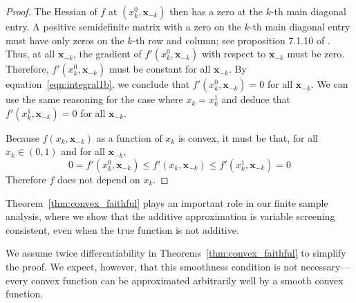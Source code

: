\begin{proof}
The Hessian of $f$ at $(x^0_k, \mathbf{x}_{-k})$ then has a zero at
the $k$-th main diagonal entry. A positive semidefinite matrix with a
zero on the $k$-th main diagonal entry must have only zeros on the
$k$-th row and column; see proposition 7.1.10 of
\citet{HJ90}.  Thus, at all $\mathbf{x}_{-k}$, the
gradient of $f'(x^0_k, \mathbf{x}_{-k})$ with respect to
$\mathbf{x}_{-k}$ must be zero.
Therefore, $f'(x_k^0, \mathbf{x}_{-k})$ must be constant for all
$\mathbf{x}_{-k}$. By equation~\ref{eqn:integral1b}, we conclude 
that $f'(x_k^0, \mathbf{x}_{-k}) = 0$ for all $\mathbf{x}_{-k}$. We
can use the same reasoning for the case where $x_k = x_k^1$ and deduce
that $f'(x^1_k, \mathbf{x}_{-k}) = 0$ for all $\mathbf{x}_{-k}$. 

Because $f(x_k, \mathbf{x}_{-k})$ as a function of $x_k$ is convex, it must be that, for all $x_k \in (0,1)$ and for all $\mathbf{x}_{-k}$,
\begin{equation}
0 = f'(x_k^0, \mathbf{x}_{-k}) \leq f'(x_k, \mathbf{x}_{-k}) \leq 
    f'(x_k^1, \mathbf{x}_{-k}) = 0
\end{equation}
Therefore $f$ does not depend on $x_k$.
\end{proof}


Theorem~\ref{thm:convex_faithful} plays an important role in our
finite sample analysis, where we show that the additive
approximation is variable screening consistent, even when the true function is not
additive.


\begin{remark}
  We assume twice differentiability in
  Theorems~\ref{thm:convex_faithful} to simplify the proof.  We
  expect, however, that this smoothness condition is not
  necessary---every convex function can be approximated arbitrarily
  well by a smooth convex function.
\end{remark}


